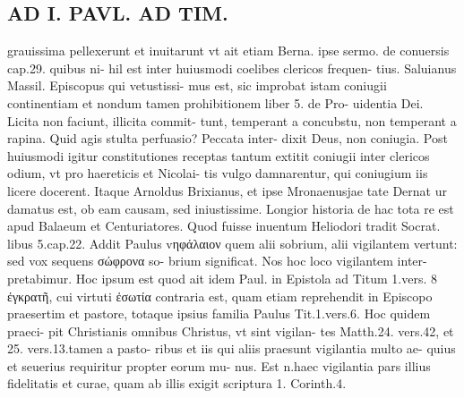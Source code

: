 \documentclass{article}
\begin{document}
\begin{pages}
\section*{AD I. PAVL. AD TIM. }
\marginpar{[ p.118 ]}\pstart grauissima pellexerunt et inuitarunt vt ait etiam Berna. ipse sermo. de conuersis cap.29. quibus ni- hil est inter huiusmodi coelibes clericos frequen- tius. Saluianus Massil. Episcopus qui vetustissi- mus est, sic improbat istam coniugii continentiam et nondum tamen prohibitionem liber  5. de Pro- uidentia Dei. Licita non faciunt, illicita commit- tunt, temperant a concubstu, non temperant a rapina. Quid agis stulta perfuasio? Peccata inter- dixit Deus, non coniugia. Post huiusmodi igitur constitutiones receptas tantum extitit coniugii inter clericos odium, vt pro haereticis et Nicolai- tis vulgo damnarentur, qui coniugium iis licere docerent. Itaque Arnoldus Brixianus, et ipse Mronaenusjae tate Dernat ur damatus est, ob eam causam, sed iniustissime. Longior historia de hac tota re est apud Balaeum et Centuriatores. Quod fuisse inuentum Heliodori tradit Socrat. libus 5.cap.22.  \pend\pstart Addit Paulus vηφάλαιον quem alii sobrium, alii vigilantem vertunt: sed vox sequens σώφρονα so- brium significat. Nos hoc loco vigilantem inter- pretabimur. Hoc ipsum est quod ait idem Paul. in Epistola ad Titum 1.vers. 8 ἐγκρατῆ, cui virtuti ἐσωτία contraria est, quam etiam reprehendit in Episcopo praesertim et pastore, totaque ipsius familia Paulus Tit.1.vers.6. Hoc quidem praeci- pit Christianis omnibus Christus, vt sint vigilan- tes Matth.24. vers.42, et 25. vers.13.tamen a pasto- ribus et iis qui aliis praesunt vigilantia multo ae- quius et seuerius requiritur propter eorum mu- nus. Est n.haec vigilantia pars illius fidelitatis et curae, quam ab illis exigit scriptura 1. Corinth.4.  \pend

\end{pages}
\end{document}
